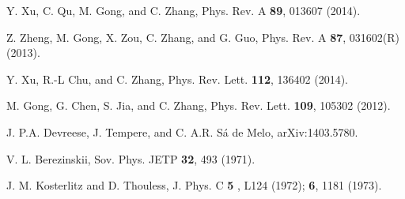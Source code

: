 \documentclass[prl,aps,twocolumn,showpacs, floatfix]{revtex4}
\begin{document}
\begin{widetext}
\begin{thebibliography}{9}
 {Y. Xu, C. Qu, M. Gong, and C. Zhang, Phys. Rev. A
\textbf{89}, 013607 (2014).}

 {Z. Zheng, M. Gong, X. Zou, C. Zhang, and G. Guo,
Phys. Rev. A \textbf{87}, 031602(R) (2013).}

 {Y. Xu, R.-L Chu, and C. Zhang, Phys. Rev. Lett.
\textbf{112}, 136402 (2014).}

 {M. Gong, G. Chen, S. Jia, and C. Zhang, Phys. Rev.
Lett. \textbf{109}, 105302 (2012).}

 {J. P.A. Devreese, J. Tempere, and C. A.R. S\'a de
Melo, arXiv:1403.5780.}

 {V. L. Berezinskii, Sov. Phys. JETP \textbf{32}, 493
(1971).}

 {J. M. Kosterlitz and D. Thouless, J. Phys. C \textbf{5}%
, L124 (1972); \textbf{6}, 1181 (1973).}
\end{thebibliography}
\end{widetext}
\end{document}
